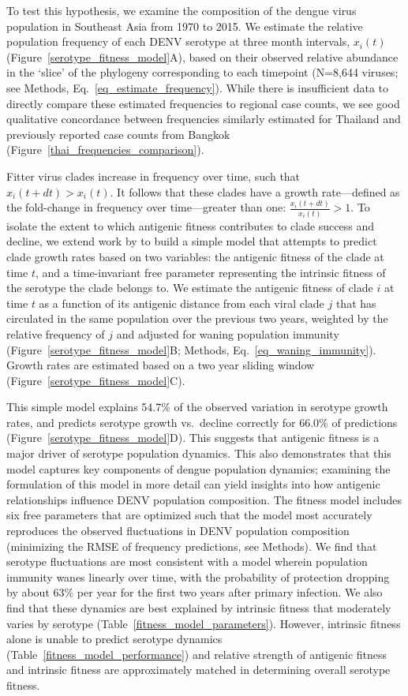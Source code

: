\documentclass[11pt,oneside,letterpaper]{article}
\begin{document}
To test this hypothesis, we examine the composition of the dengue virus population in Southeast Asia from 1970 to 2015.
We estimate the relative population frequency of each DENV serotype at three month intervals, $x_i(t)$ (Figure~\ref{serotype_fitness_model}A), based on their observed relative abundance in the `slice' of the phylogeny corresponding to each timepoint (N=8,644 viruses; see Methods, Eq.~\ref{eq_estimate_frequency}).
While there is insufficient data to directly compare these estimated frequencies to regional case counts, we see good qualitative concordance between frequencies similarly estimated for Thailand and previously reported case counts from Bangkok (Figure~\ref{thai_frequencies_comparison}).

Fitter virus clades increase in frequency over time, such that $x_i(t+dt) > x_i(t)$.
It follows that these clades have a growth rate---defined as the fold-change in frequency over time---greater than one: $\frac{x_i(t+dt)}{x_i(t)} > 1$.
To isolate the extent to which antigenic fitness contributes to clade success and decline, we extend work by \citet{luksza2014predictive} to build a simple model that attempts to predict clade growth rates based on two variables: the antigenic fitness of the clade at time $t$, and a time-invariant free parameter representing the intrinsic fitness of the serotype the clade belongs to.
We estimate the antigenic fitness of clade $i$ at time $t$ as a function of its antigenic distance from each viral clade $j$ that has circulated in the same population over the previous two years, weighted by the relative frequency of $j$ and adjusted for waning population immunity (Figure~\ref{serotype_fitness_model}B; Methods, Eq.~\ref{eq_waning_immunity}).
Growth rates are estimated based on a two year sliding window (Figure~\ref{serotype_fitness_model}C).

This simple model explains 54.7\% of the observed variation in serotype growth rates, and predicts serotype growth vs.\ decline correctly for 66.0\% of predictions (Figure~\ref{serotype_fitness_model}D).
This suggests that antigenic fitness is a major driver of serotype population dynamics.
This also demonstrates that this model captures key components of dengue population dynamics; examining the formulation of this model in more detail can yield insights into how antigenic relationships influence DENV population composition.
The fitness model includes six free parameters that are optimized such that the model most accurately reproduces the observed fluctuations in DENV population composition (minimizing the RMSE of frequency predictions, see Methods).
We find that serotype fluctuations are most consistent with a model wherein population immunity wanes linearly over time, with the probability of protection dropping by about 63\% per year for the first two years after primary infection.
We also find that these dynamics are best explained by intrinsic fitness that moderately varies by serotype (Table~\ref{fitness_model_parameters}).
However, intrinsic fitness alone is unable to predict serotype dynamics (Table~\ref{fitness_model_performance}) and relative strength of antigenic fitness and intrinsic fitness are approximately matched in determining overall serotype fitness.
\end{document}
